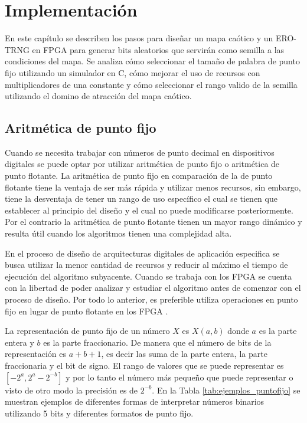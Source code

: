 \chapter{Implementación}

    En este capítulo se describen los pasos para diseñar un mapa caótico y un ERO-TRNG en FPGA para generar bits aleatorios que servirán como semilla a las condiciones del mapa. Se analiza cómo seleccionar el tamaño de palabra de punto fijo utilizando un simulador en C, cómo mejorar el uso de recursos con multiplicadores de una constante y cómo seleccionar el rango valido de la semilla utilizando el domino de atracción del mapa caótico.

    \section{Aritmética de punto fijo}
        
        Cuando se necesita trabajar con números de punto decimal en dispositivos digitales se puede optar por utilizar aritmética de punto fijo o aritmética de punto flotante. La aritmética de punto fijo en comparación de la de punto flotante tiene la ventaja de ser más rápida y utilizar menos recursos, sin embargo, tiene la desventaja de tener un rango de uso específico el cual se tienen que establecer al principio del diseño y el cual no puede modificarse posteriormente. Por el contrario la aritmética de punto flotante tienen un mayor rango dinámico y resulta útil cuando los algoritmos tienen una complejidad alta. 

        En el proceso de diseño de arquitecturas digitales de aplicación especifica se busca utilizar la menor cantidad de recursos y reducir al máximo el tiempo de ejecución del algoritmo subyacente. Cuando se trabaja con los FPGA se cuenta con la libertad de poder analizar y estudiar el algoritmo antes de comenzar con el proceso de diseño. Por todo lo anterior, es preferible utiliza operaciones en punto fijo en lugar de punto flotante en los FPGA \cite{TleloCuautle2016}.

        La representación de punto fijo de un número $X$ es $X(a,b)$ donde $a$ es la parte entera y $b$ es la parte fraccionario. De manera que el número de bits de la representación es $a+b+1$, es decir las suma de la parte entera, la parte fraccionaria y el bit de signo. El rango de valores que se puede representar es $[-2^{a}, 2^{a} - 2^{-b}]$ y por lo tanto el número más pequeño que puede representar o visto de otro modo la precisión es de $2^{-b}$. En la Tabla \ref{tab:ejemplos_puntofijo} se muestran ejemplos de diferentes formas de interpretar números binarios  utilizando 5 bits y diferentes formatos de punto fijo.
        
